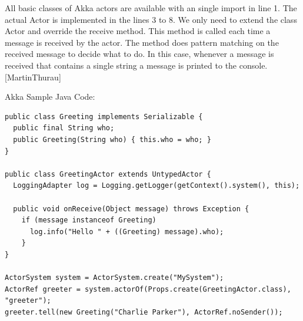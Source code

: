 All basic classes of Akka actors are available with an single import in line 1. The actual Actor is implemented in the lines 3 to 8. We only need to extend the class Actor and override the receive method. This method is called each time a message is received by the actor. The method does pattern matching on the received message to decide what to do. In this case, whenever a message is received that contains a single string a message is printed to the console.[MartinThurau]

Akka Sample Java Code:~\parencite{akkaHome}
\begin{lstlisting}
public class Greeting implements Serializable {
  public final String who;
  public Greeting(String who) { this.who = who; }
}

public class GreetingActor extends UntypedActor {
  LoggingAdapter log = Logging.getLogger(getContext().system(), this);

  public void onReceive(Object message) throws Exception {
    if (message instanceof Greeting)
      log.info("Hello " + ((Greeting) message).who);
    }
}

ActorSystem system = ActorSystem.create("MySystem");
ActorRef greeter = system.actorOf(Props.create(GreetingActor.class), "greeter");
greeter.tell(new Greeting("Charlie Parker"), ActorRef.noSender());
\end{lstlisting}

